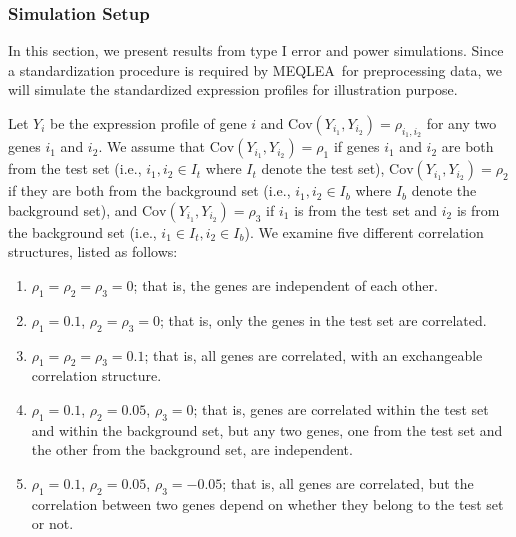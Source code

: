 \documentclass[useAMS,usenatbib, galley]{biom}
\newcommand{\OurMethod}{MEQLEA}
\newcommand{\aaCase}{a}
\newcommand{\aCase}{b}
\newcommand{\cCase}{c}
\newcommand{\eCase}{d}
\newcommand{\fCase}{e}
\begin{document}
		\subsubsection{Simulation Setup}\label{subsection:simulation}
		In this section, we present results from type I error and power simulations. Since a standardization procedure is required by \OurMethod~for preprocessing data, we will simulate the standardized expression profiles for illustration purpose. 
		
		Let $Y_{i}$ be the expression profile of gene $i$ and $\text{Cov}(Y_{i_1}, Y_{i_2})=\rho_{i_1, i_2}$ for any two genes $i_1$ and $i_2$. We assume that $\text{Cov}(Y_{i_1}, Y_{i_2})= \rho_1$ if genes $i_1$ and $i_2$ are both from the test set (i.e., $i_1, i_2 \in I_t$ where $I_t$ denote the test set),  $\text{Cov}(Y_{i_1}, Y_{i_2}) =\rho_2$ if they are both from the background set (i.e.,  $ i_1, i_2\in I_b$ where $I_b$ denote the background set), and  $\text{Cov}(Y_{i_1}, Y_{i_2})= \rho_3$ if $i_1$ is from the test set and $i_2$ is from the background set (i.e., $i_1\in I_t, i_2\in I_b$). We examine five different correlation structures, listed as follows:
		
		\begin{enumerate}
			\item[(\aaCase):] $\rho_1 = \rho_2 = \rho_3 = 0$; that is, the genes are independent of each other.
			\item[(\aCase):] $\rho_1 = 0.1$, $\rho_2 = \rho_3 = 0$; that is, only the genes in the test set are correlated.
			\item[(\cCase):] $\rho_1 = \rho_2 = \rho_3 = 0.1$; that is, all genes are correlated, with an exchangeable correlation structure. 
			\item[(\eCase):] $\rho_1 = 0.1$, $\rho_2 = 0.05$, $\rho_3 = 0$; that is, 
			genes are correlated within the test set and within the background set, but any two genes, one from the test set and the other from the background set, are independent.
			\item[(\fCase):] $\rho_1 = 0.1$, $\rho_2 = 0.05$, $\rho_3 = -0.05$; that is, all genes are correlated, but the correlation between two genes depend on whether they belong to the test set or not.
		\end{enumerate}
		
\end{document}
